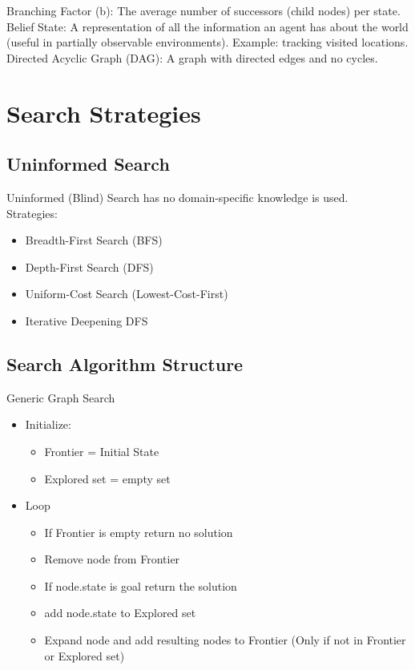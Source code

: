 Branching Factor (b): The average number of successors (child nodes) per state. \\

Belief State:  A representation of all the information an agent has about the world (useful in partially observable environments). Example: tracking visited locations.\\

Directed Acyclic Graph (DAG):  A graph with directed edges and no cycles.

\section{Search Strategies}

\subsection{Uninformed Search}

Uninformed (Blind) Search has no domain-specific knowledge is used.\\

Strategies:

\begin{itemize}
    \item Breadth-First Search (BFS)
    \item Depth-First Search (DFS)
    \item Uniform-Cost Search (Lowest-Cost-First)
    \item Iterative Deepening DFS\\
\end{itemize}

\subsection{Search Algorithm Structure}

Generic Graph Search\\

\begin{itemize}
    \item Initialize:\begin{itemize}
        \item Frontier = {Initial State}
        \item Explored set = empty set
    \end{itemize}
    \item Loop \begin{itemize}
        \item If Frontier is empty return no solution
        \item Remove node from Frontier
        \item If node.state is goal return the solution
        \item add node.state to Explored set
        \item Expand node and add resulting nodes to Frontier (Only if not in Frontier or Explored set)\\
    \end{itemize}
\end{itemize}


